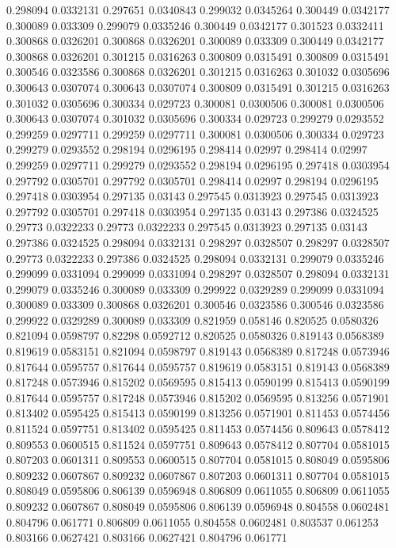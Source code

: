 0.298094 0.0332131
0.297651 0.0340843
0.299032 0.0345264
0.300449 0.0342177
0.300089 0.033309
0.299079 0.0335246
0.300449 0.0342177
0.301523 0.0332411
0.300868 0.0326201
0.300868 0.0326201
0.300089 0.033309
0.300449 0.0342177
0.300868 0.0326201
0.301215 0.0316263
0.300809 0.0315491
0.300809 0.0315491
0.300546 0.0323586
0.300868 0.0326201
0.301215 0.0316263
0.301032 0.0305696
0.300643 0.0307074
0.300643 0.0307074
0.300809 0.0315491
0.301215 0.0316263
0.301032 0.0305696
0.300334 0.029723
0.300081 0.0300506
0.300081 0.0300506
0.300643 0.0307074
0.301032 0.0305696
0.300334 0.029723
0.299279 0.0293552
0.299259 0.0297711
0.299259 0.0297711
0.300081 0.0300506
0.300334 0.029723
0.299279 0.0293552
0.298194 0.0296195
0.298414 0.02997
0.298414 0.02997
0.299259 0.0297711
0.299279 0.0293552
0.298194 0.0296195
0.297418 0.0303954
0.297792 0.0305701
0.297792 0.0305701
0.298414 0.02997
0.298194 0.0296195
0.297418 0.0303954
0.297135 0.03143
0.297545 0.0313923
0.297545 0.0313923
0.297792 0.0305701
0.297418 0.0303954
0.297135 0.03143
0.297386 0.0324525
0.29773 0.0322233
0.29773 0.0322233
0.297545 0.0313923
0.297135 0.03143
0.297386 0.0324525
0.298094 0.0332131
0.298297 0.0328507
0.298297 0.0328507
0.29773 0.0322233
0.297386 0.0324525
0.298094 0.0332131
0.299079 0.0335246
0.299099 0.0331094
0.299099 0.0331094
0.298297 0.0328507
0.298094 0.0332131
0.299079 0.0335246
0.300089 0.033309
0.299922 0.0329289
0.299099 0.0331094
0.300089 0.033309
0.300868 0.0326201
0.300546 0.0323586
0.300546 0.0323586
0.299922 0.0329289
0.300089 0.033309
0.821959 0.058146
0.820525 0.0580326
0.821094 0.0598797
0.82298 0.0592712
0.820525 0.0580326
0.819143 0.0568389
0.819619 0.0583151
0.821094 0.0598797
0.819143 0.0568389
0.817248 0.0573946
0.817644 0.0595757
0.817644 0.0595757
0.819619 0.0583151
0.819143 0.0568389
0.817248 0.0573946
0.815202 0.0569595
0.815413 0.0590199
0.815413 0.0590199
0.817644 0.0595757
0.817248 0.0573946
0.815202 0.0569595
0.813256 0.0571901
0.813402 0.0595425
0.815413 0.0590199
0.813256 0.0571901
0.811453 0.0574456
0.811524 0.0597751
0.813402 0.0595425
0.811453 0.0574456
0.809643 0.0578412
0.809553 0.0600515
0.811524 0.0597751
0.809643 0.0578412
0.807704 0.0581015
0.807203 0.0601311
0.809553 0.0600515
0.807704 0.0581015
0.808049 0.0595806
0.809232 0.0607867
0.809232 0.0607867
0.807203 0.0601311
0.807704 0.0581015
0.808049 0.0595806
0.806139 0.0596948
0.806809 0.0611055
0.806809 0.0611055
0.809232 0.0607867
0.808049 0.0595806
0.806139 0.0596948
0.804558 0.0602481
0.804796 0.061771
0.806809 0.0611055
0.804558 0.0602481
0.803537 0.061253
0.803166 0.0627421
0.803166 0.0627421
0.804796 0.061771

